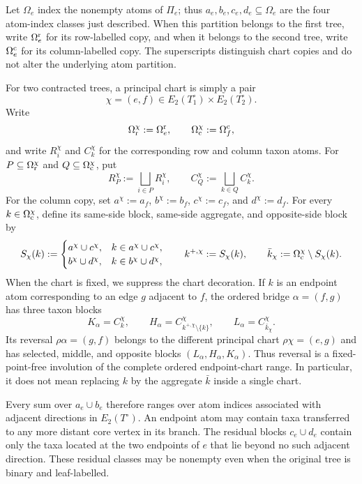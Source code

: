 \documentclass[11pt]{article}
\begin{document}
Let $\Omega_e$ index the nonempty atoms of $\Pi_e$; thus
$a_e,b_e,c_e,d_e\subseteq\Omega_e$ are the four atom-index classes just
described.  When this partition belongs to the first tree, write
$\Omega_e^{\rm r}$ for its row-labelled copy, and when it belongs to the
second tree, write $\Omega_e^{\rm c}$ for its column-labelled copy.  The
superscripts distinguish chart copies and do not alter the underlying atom
partition.

For two contracted trees, a principal chart is simply a pair
\[
 \chi=(e,f)\in E_2(T_1^\circ)\times E_2(T_2^\circ).
\]
Write
\[
 \Omega_{\rm r}^\chi:=\Omega_e^{\rm r},\qquad
 \Omega_{\rm c}^\chi:=\Omega_f^{\rm c},
\]
and write $R_i^\chi$ and $C_k^\chi$ for the corresponding row and column
taxon atoms.  For $P\subseteq\Omega_{\rm r}^\chi$ and
$Q\subseteq\Omega_{\rm c}^\chi$, put
\[
 R_P^\chi:=\bigsqcup_{i\in P}R_i^\chi,\qquad
 C_Q^\chi:=\bigsqcup_{k\in Q}C_k^\chi.
\]
For the column copy, set $a^\chi:=a_f$, $b^\chi:=b_f$,
$c^\chi:=c_f$, and $d^\chi:=d_f$.  For every
$k\in\Omega_{\rm c}^\chi$, define its same-side block, same-side aggregate,
and opposite-side block by
\[
 S_\chi(k):=
 \begin{cases}
 a^\chi\cup c^\chi,&k\in a^\chi\cup c^\chi,\\
 b^\chi\cup d^\chi,&k\in b^\chi\cup d^\chi,
 \end{cases}
 \qquad
 k^{+,\chi}:=S_\chi(k),\qquad
 \bar k_\chi:=\Omega_{\rm c}^\chi\setminus S_\chi(k).
\]
When the chart is fixed, we suppress the chart decoration.  If $k$ is an
endpoint atom corresponding to an edge $g$ adjacent to $f$, the ordered bridge
$\alpha=(f,g)$ has three taxon blocks
\[
 K_\alpha=C_k^\chi,\qquad
 H_\alpha=C_{k^{+,\chi}\setminus\{k\}}^\chi,\qquad
 L_\alpha=C_{\bar k_\chi}^\chi.
\]
Its reversal $\rho\alpha=(g,f)$ belongs to the different principal chart
$\rho\chi=(e,g)$ and has selected, middle, and opposite blocks
$(L_\alpha,H_\alpha,K_\alpha)$.  Thus reversal is a fixed-point-free
involution of the complete ordered endpoint-chart range.  In particular, it
does not mean replacing $k$ by the aggregate $\bar k$ inside a single chart.

Every sum over $a_e\cup b_e$ therefore ranges over atom indices associated
with adjacent directions in $E_2(T^\circ)$.  An endpoint atom may contain
taxa transferred to any more distant core vertex in its branch.  The
residual blocks $c_e\cup d_e$ contain only the taxa located at the two
endpoints of $e$ that lie beyond no such adjacent direction.  These
residual classes may be nonempty even when the original tree is binary and
leaf-labelled.
\end{document}
